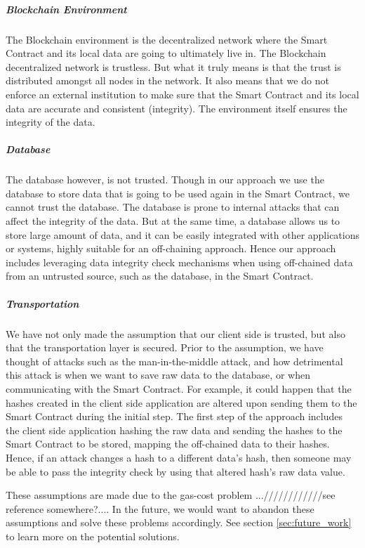 \subparagraph{Blockchain Environment}
The Blockchain environment is the decentralized network where the Smart Contract and its local data are going to ultimately live in. The Blockchain decentralized network is trustless. But what it truly means is that the trust is distributed amongst all nodes in the network. It also means that we do not enforce an external institution to make sure that the Smart Contract and its local data are accurate and consistent (integrity). The environment itself ensures the integrity of the data.

\subparagraph{Database}
The database however, is not trusted. Though in our approach we use the database to store data that is going to be used again in the Smart Contract, we cannot trust the database. The database is prone to internal attacks that can affect the integrity of the data. But at the same time, a database allows us to store large amount of data, and it can be easily integrated with other applications or systems, highly suitable for an off-chaining approach. Hence our approach includes leveraging data integrity check mechanisms when using off-chained data from an untrusted source, such as the database, in the Smart Contract.

\subparagraph{Transportation}
We have not only made the assumption that our client side is trusted, but also that the transportation layer is secured. Prior to the assumption, we have thought of attacks such as the man-in-the-middle attack, and how detrimental this attack is when we want to save raw data to the database, or when communicating with the Smart Contract. For example, it could happen that the hashes created in the client side application are altered upon sending them to the Smart Contract during the initial step. The first step of the approach includes the client side application hashing the raw data and sending the hashes to the Smart Contract to be stored, mapping the off-chained data to their hashes. Hence, if an attack changes a hash to a different data’s hash, then someone may be able to pass the integrity check by using that altered hash’s raw data value.

These assumptions are made due to the gas-cost problem ...////////////see reference somewhere?.... In the future, we would want to abandon these assumptions and solve these problems accordingly. See section \ref{sec:future_work} to learn more on the potential solutions.
